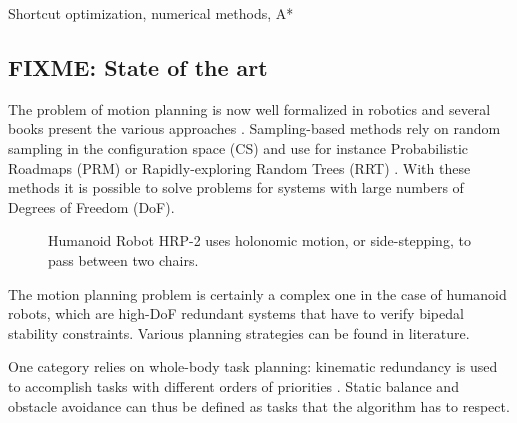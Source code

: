Shortcut optimization, numerical methods, A* 

\subsection{FIXME: State of the art}
\label{subsec:humanoid-walk-planning}
The problem of motion planning is now well formalized in robotics and
several books present the various approaches
\cite{lato91,chos05,lava06}. Sampling-based methods rely on random
sampling in the configuration space (CS) and use for instance
Probabilistic Roadmaps (PRM) \cite{kavr96} or Rapidly-exploring Random
Trees (RRT) \cite{kuff00}. With these methods it is possible to solve
problems for systems with large numbers of Degrees of Freedom (DoF).
\begin{figure}
  \caption{Humanoid Robot HRP-2 uses holonomic motion, or
    side-stepping, to pass between two chairs.}
  \label{fig:hrp2-chairs}
\end{figure}

The motion planning problem is certainly a complex one in the case of
humanoid robots, which are high-DoF redundant systems that have to
verify bipedal stability constraints. Various planning strategies can
be found in literature.

One category relies on whole-body task planning: kinematic redundancy
is used to accomplish tasks with different orders of priorities
\cite{khat04,kano09}. Static balance and obstacle avoidance can
thus be defined as tasks that the algorithm has to respect.

